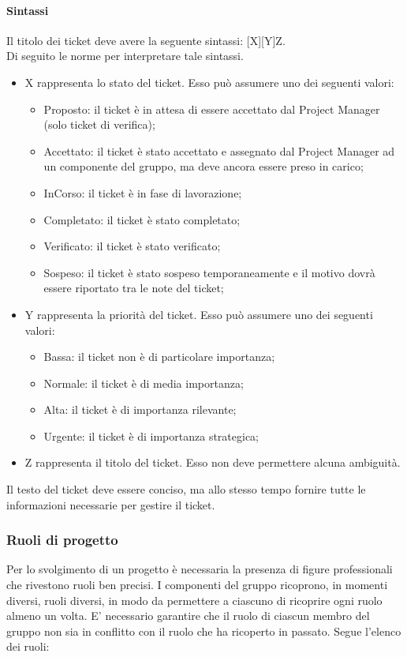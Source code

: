 			\paragraph{Sintassi}
				Il titolo dei ticket deve avere la seguente sintassi: [X][Y]Z.\\
				Di seguito le norme per interpretare tale sintassi.
				\begin{itemize}
					\item X rappresenta lo stato del ticket. Esso può assumere uno dei seguenti valori:
					\begin{itemize}
						\item Proposto: il ticket è in attesa di essere accettato dal Project Manager (solo ticket di verifica);
						\item Accettato: il ticket è stato accettato e assegnato dal Project Manager ad un componente del gruppo, ma deve ancora essere preso in carico;
						\item InCorso: il ticket è in fase di lavorazione;
						\item Completato: il ticket è stato completato;
						\item Verificato: il ticket è stato verificato;
						\item Sospeso: il ticket è stato sospeso temporaneamente e il motivo dovrà essere riportato tra le note del ticket;
					\end{itemize}
					\item Y rappresenta la priorità del ticket. Esso può assumere uno dei seguenti valori:
					\begin{itemize}
						\item Bassa: il ticket non è di particolare importanza;
						\item Normale: il ticket è di media importanza;
						\item Alta: il ticket è di importanza rilevante;
						\item Urgente: il ticket è di importanza strategica;
					\end{itemize}
					\item Z rappresenta il titolo del ticket. Esso non deve permettere alcuna ambiguità.
				\end{itemize}
				Il testo del ticket deve essere conciso, ma allo stesso tempo fornire tutte le informazioni necessarie per gestire il ticket.
		\subsubsection{Ruoli di progetto}
			Per lo svolgimento di un progetto è necessaria la presenza di figure professionali che rivestono ruoli ben precisi. I componenti del gruppo ricoprono, in momenti diversi, ruoli diversi, in modo da permettere a ciascuno di ricoprire ogni ruolo almeno un volta. E' necessario garantire che il ruolo di ciascun membro del gruppo non sia in conflitto con il ruolo che ha ricoperto in passato. Segue l'elenco dei ruoli:
